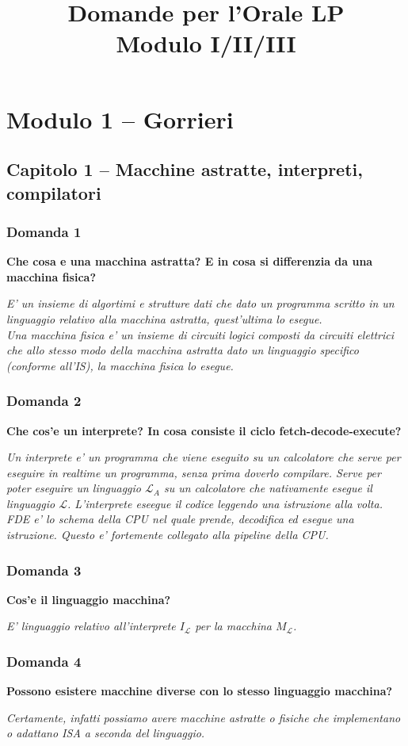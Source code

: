 \documentclass[12pt,a4paper,tikz,border=5pt]{article}
\title{%
  \textbf{Domande per l'Orale LP}\\[0.4em]
  \large Modulo I/II/III%
}
\author{}
\date{}
\newcommand{\domanda}[3]{%
  \subsubsection*{Domanda #1}
  \textbf{#2}
  \begin{mdframed}[backgroundcolor=grigiochiarissimo, linecolor=gray!50, linewidth=0.6pt, innertopmargin=6pt, innerbottommargin=12pt, innerleftmargin=8pt, innerrightmargin=8pt]
    \textit{#3}%
  \end{mdframed}%
  \vspace{0.4em}
}
\begin{document}
\maketitle


\tableofcontents
\newpage

\section{Modulo 1 -- Gorrieri}

\subsection{Capitolo 1 -- Macchine astratte, interpreti, compilatori}

\domanda{1}{Che cosa e una macchina astratta? E in cosa si differenzia da una macchina fisica?}{E' un insieme di algortimi e strutture dati che dato un programma scritto in un linguaggio relativo alla macchina astratta, quest'ultima lo esegue.\\
Una macchina fisica e' un insieme di circuiti logici composti da circuiti elettrici che allo stesso modo della macchina astratta dato un linguaggio specifico (conforme all'IS), la macchina fisica lo esegue.}

\domanda{2}{Che cos'e un interprete? In cosa consiste il ciclo fetch-decode-execute?}{Un interprete e' un programma che viene eseguito su un calcolatore che serve per eseguire in realtime un programma, senza prima doverlo compilare. Serve per poter eseguire un linguaggio $\mathcal{L}_A$ su un calcolatore che nativamente esegue il linguaggio $\mathcal{L}$. L'interprete eseegue il codice leggendo una istruzione alla volta.\\
FDE e' lo schema della CPU nel quale prende, decodifica ed esegue una istruzione. Questo e' fortemente collegato alla pipeline della CPU.}

\domanda{3}{Cos'e il linguaggio macchina?}{E' linguaggio relativo all'interprete $I_\mathcal{L}$ per la macchina $M_\mathcal{L}$.}

\domanda{4}{Possono esistere macchine diverse con lo stesso linguaggio macchina?}{Certamente, infatti possiamo avere macchine astratte o fisiche che implementano o adattano ISA a seconda del linguaggio.}
\end{document}
